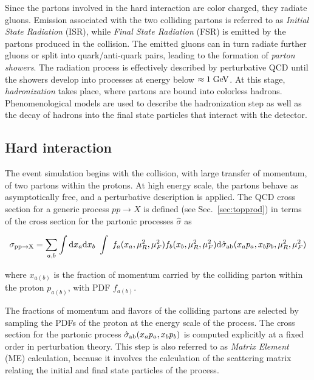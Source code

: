 Since the partons involved in the hard interaction are color charged,
they radiate gluons. Emission associated with the two colliding partons  
is referred to as {\it Initial State Radiation} (ISR), while {\it
  Final State Radiation} (FSR) is emitted by the partons produced in
the collision. The emitted gluons can in turn radiate further gluons or split into
quark/anti-quark pairs, leading to the formation of {\it parton
  showers}.
The radiation process is effectively described by perturbative QCD until
the showers develop into processes at energy below $\approx1\; \mathrm{GeV}{}$.
At this stage, {\it hadronization} takes place, where partons are
bound into colorless hadrons. Phenomenological models are used to
describe the hadronization step as well as the decay of hadrons into
the final state particles that interact with the detector.

\subsection{Hard interaction}
\label{sec:hardinteraction}

The event simulation begins with the collision, with large transfer of
momentum, of two partons within the protons. At high energy scale, the
partons behave as asymptotically free, and a perturbative description
is applied. The QCD cross section for a generic process $pp\to X$ is
defined (see Sec.~\ref{sec:topprod}) in terms of the cross section for
the partonic processes $\hat{\sigma}$ as

\begin{equation}
  \sigma_{{\rm pp}\to{\rm X}}
  = \sum_{a,b}
  \int{\rm d}x_a{\rm d}x_b
  ~ \int
  ~ f_a(x_a,\mu_R^2{},\mu_F^2{}) f_b(x_b,\mu_R^2{},\mu_F^2{})
  {\rm d}\hat{\sigma}_{\rm ab}(x_ap_a, x_bp_b,\mu_R^2{},\mu_F^2{}) \\
  \label{eq:qcdxsec}
\end{equation}

where $x_{a(b)}$ is the fraction of momentum carried by the colliding
parton within the proton $p_{a(b)}$, with PDF $f_{a(b)}$.

The fractions of momentum and flavors of the colliding partons are
selected by sampling the PDFs of the proton at the energy scale of the
process. The cross section for the partonic process $\hat{\sigma}_{\rm
  ab}(x_ap_a, x_bp_b)$ is computed explicitly at a fixed order  in
perturbation theory. This step is also referred to as {\it Matrix
  Element} (ME) calculation, because it involves the calculation of
the scattering matrix relating the initial and final state particles of the process.

